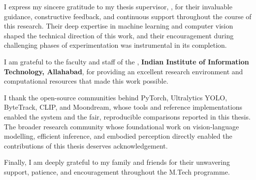 \clearpage
\begin{acknowledgements}
\addchaptertocentry{\acknowledgementname}

I express my sincere gratitude to my thesis supervisor, \textbf{\supname}, for their invaluable guidance, constructive feedback, and continuous support throughout the course of this research. Their deep expertise in machine learning and computer vision shaped the technical direction of this work, and their encouragement during challenging phases of experimentation was instrumental in its completion.

\vspace{4mm}
I am grateful to the faculty and staff of the \textbf{\deptname}, \textbf{Indian Institute of Information Technology, Allahabad}, for providing an excellent research environment and computational resources that made this work possible.

\vspace{4mm}
I thank the open-source communities behind PyTorch, Ultralytics YOLO, ByteTrack, CLIP, and Moondream, whose tools and reference implementations enabled the system and the fair, reproducible comparisons reported in this thesis. The broader research community whose foundational work on vision-language modelling, efficient inference, and embodied perception directly enabled the contributions of this thesis deserves acknowledgement.

\vspace{4mm}
Finally, I am deeply grateful to my family and friends for their unwavering support, patience, and encouragement throughout the M.Tech programme.

\end{acknowledgements}


\tableofcontents
\listoffigures
\listoftables


